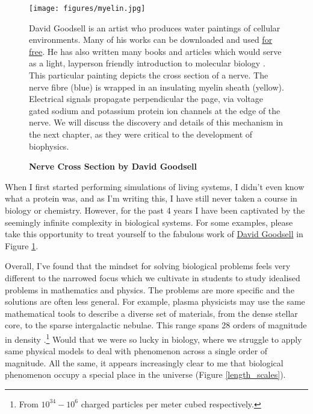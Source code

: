 \begin{figure}[h]
	\begin{center}
		\texttt{[image: figures/myelin.jpg]}
	\end{center}
	\captionsetup{singlelinecheck = false, justification=raggedright}
	\caption[Nerve Cross Section by David Goodsell] {\textbf{Nerve Cross Section by David Goodsell}}{David Goodsell is an artist who produces water paintings of cellular environments. Many of his works can be downloaded and used \href{https://pdb101.rcsb.org/sci-art/goodsell-gallery}{for free}. He has also written many books and articles which would serve as a light, layperson friendly introduction to molecular biology \cite{goodsell2009, goodsell2018, goodsell2020}. This particular painting depicts the cross section of a nerve. The nerve fibre (blue) is wrapped in an insulating myelin sheath (yellow). Electrical signals propagate perpendicular the page, via voltage gated sodium and potassium protein ion channels at the edge of the nerve\cite{goodsell_nerve}. We will discuss the discovery and details of this mechanism in the next chapter, as they were critical to the development of biophysics.}
	\label{goodsell_figure}
\end{figure}

When I first started performing simulations of living systems, I didn't even know what a protein was, and as I'm writing this, I have still never taken a course in biology or chemistry. However, for the past 4 years I have been captivated by the seemingly infinite complexity in biological systems. For some examples, please take this opportunity to treat yourself to the fabulous work of \href {https://pdb101.rcsb.org/sci-art/goodsell-gallery}{David Goodsell} in Figure \ref{goodsell_figure}. 

Overall, I've found that the mindset for solving biological problems feels very different to the narrowed focus which we cultivate in students to study idealised problems in mathematics and physics. The problems are more specific and the solutions are often less general. For example, plasma physicists may use the same mathematical tools to describe a diverse set of materials, from the dense stellar core, to the sparse intergalactic nebulae. This range spans 28 orders of magnitude in density \cite{chen2018}.\footnote{From $10^{34}-10^6$ charged particles per meter cubed respectively.} Would that we were so lucky in biology, where we struggle to apply same physical models to deal with phenomenon across a single order of magnitude. All the same, it appears increasingly clear to me that biological phenomenon occupy a special place in the universe (Figure \ref{length_scales}). 


